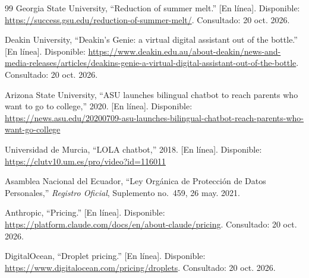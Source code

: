 \documentclass[conference]{IEEEtran}
\begin{document}
\begin{thebibliography}{99}
Georgia State University, ``Reduction of summer melt.'' [En línea]. Disponible: \url{https://success.gsu.edu/reduction-of-summer-melt/}. Consultado: 20 oct. 2026.

Deakin University, ``Deakin's Genie: a virtual digital assistant out of the bottle.'' [En línea]. Disponible: \url{https://www.deakin.edu.au/about-deakin/news-and-media-releases/articles/deakins-genie-a-virtual-digital-assistant-out-of-the-bottle}. Consultado: 20 oct. 2026.

Arizona State University, ``ASU launches bilingual chatbot to reach parents who want to go to college,'' 2020. [En línea]. Disponible: \url{https://news.asu.edu/20200709-asu-launches-bilingual-chatbot-reach-parents-who-want-go-college}

Universidad de Murcia, ``LOLA chatbot,'' 2018. [En línea]. Disponible: \url{https://clutv10.um.es/pro/video?id=116011}

Asamblea Nacional del Ecuador, ``Ley Orgánica de Protección de Datos Personales,'' \textit{Registro Oficial}, Suplemento no.~459, 26 may. 2021.

Anthropic, ``Pricing.'' [En línea]. Disponible: \url{https://platform.claude.com/docs/en/about-claude/pricing}. Consultado: 20 oct. 2026.

DigitalOcean, ``Droplet pricing.'' [En línea]. Disponible: \url{https://www.digitalocean.com/pricing/droplets}. Consultado: 20 oct. 2026.

\end{thebibliography}
\end{document}
